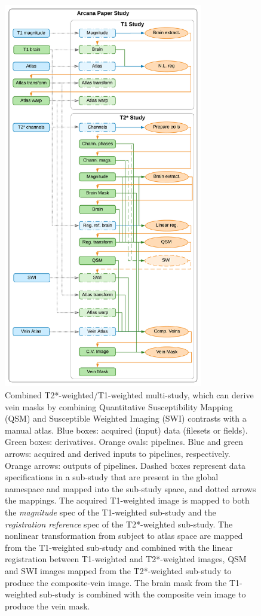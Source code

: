 \documentclass[smallextended]{svjour3}       %
\begin{document}
\begin{figure}
	\centering
    \includegraphics[width=0.775\textwidth]{figures/t2star_t1_study}
  \caption{Combined T2*-weighted/T1-weighted multi-study,
which can derive vein masks by combining Quantitative Susceptibility
Mapping (QSM) and Susceptible Weighted Imaging (SWI) contrasts with a
manual atlas. Blue boxes: acquired (input) data (filesets or fields).
Green boxes: derivatives. Orange ovals: pipelines. Blue and green
arrows: acquired and derived inputs to pipelines, respectively. Orange
arrows: outputs of pipelines. Dashed boxes represent data specifications
in a sub-study that are present in the global namespace and mapped into
the sub-study space, and dotted arrows the mappings. The acquired
T1-weighted image is mapped to both the \emph{magnitude} spec of the
T1-weighted sub-study and the \emph{registration reference} spec of the
T2*-weighted sub-study. The nonlinear transformation from subject to
atlas space are mapped from the T1-weighted sub-study and combined with
the linear registration between T1-weighted and T2*-weighted images, QSM
and SWI images mapped from the T2*-weighted sub-study to produce the
composite-vein image. The brain mask from the T1-weighted sub-study is
combined with the composite vein image to produce the vein mask.}
\label{fig:t2star_t1_study}
\end{figure} 
\end{document}
